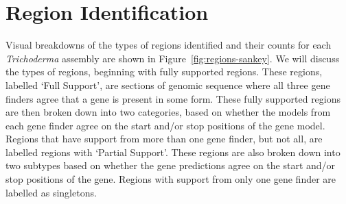 \section{Region Identification}\label{section:regions}

Visual breakdowns of the types of regions identified and their counts
for each \textit{Trichoderma} assembly are shown in
Figure~\ref{fig:regions-sankey}. We will discuss the types of regions,
beginning with fully supported regions. These regions, labelled `Full
Support', are sections of genomic sequence where all three gene
finders agree that a gene is present in some form. These fully
supported regions are then broken down into two categories, based on
whether the models from each gene finder agree on the start and/or
stop positions of the gene model. Regions that have support from more
than one gene finder, but not all, are labelled regions with `Partial
Support'. These regions are also broken down into two subtypes based
on whether the gene predictions agree on the start and/or stop
positions of the gene. Regions with support from only one gene finder
are labelled as singletons.

